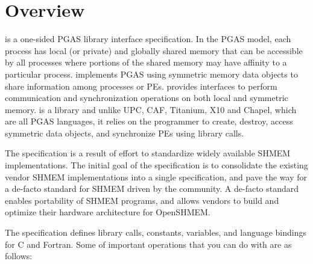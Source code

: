 \section{Overview}
\openshmem is a one-sided \ac{PGAS} library interface specification. In the \ac{PGAS} model, each process has local (or private) and 
globally shared memory that can be accessible by all processes where portions of the shared memory may have affinity to a particular process. 
\openshmem implements \ac{PGAS} using symmetric memory data objects to share information among processes or \ac{PE}s.   
\openshmem provides interfaces to perform communication and synchronization operations on both local and symmetric memory. 
\openshmem is a library and unlike UPC, CAF, Titanium, X10 and Chapel, which are all
PGAS languages, it relies on the programmer to create, destroy, access symmetric data objects, and synchronize \ac{PE}s using library calls.

The \openshmem specification is a result of effort to standardize widely available SHMEM implementations. 
The initial goal of the specification is to consolidate the existing vendor SHMEM implementations into a single specification, and  pave the way for 
a de-facto standard for SHMEM driven by the \openshmem community. A de-facto standard enables portability of SHMEM programs, and 
allows vendors to build and optimize their hardware architecture for OpenSHMEM.

The \openshmem specification defines library calls, constants, variables, and language bindings for C and Fortran.
Some of important \openshmem{} operations that you can do with \openshmem are as follows:

